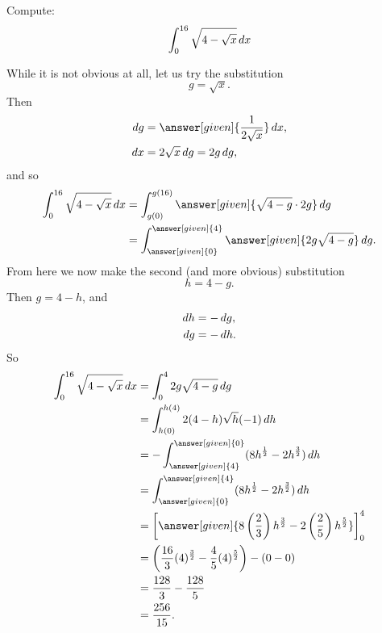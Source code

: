 \documentclass{ximera}
\begin{document}
\begin{example}
Compute:
\[
\int_0^{16} \sqrt{4 - \sqrt{x}} \mathop{}\!d x
\]
\begin{explanation}
While it is not obvious at all, let us try the substitution
\[
g = \sqrt{x}.
\]
Then
\begin{align*}
\d g &= \answer[given]{\frac{1}{2 \sqrt{x}}} \d x,\\
\d x &= 2 \sqrt{x} \d g = 2g \d g,
\end{align*}
and so
\begin{align*}
\int_0^{16} \sqrt{4 - \sqrt{x}} \d x &= \int_{g(0)}^{g(16)} \answer[given]{\sqrt{4-g} \cdot 2g} \d g  \\
&= \int_{\answer[given]{0}}^{\answer[given]{4}} \answer[given]{2g \sqrt{4-g}} \d g.
\end{align*}
From here we now make the second (and more obvious) substitution
\[
h = 4-g.
\]
Then $g = 4-h$, and
\begin{align*}
\mathop{}\!d h &= - \mathop{}\!d g,\\
\mathop{}\!d g &= - \mathop{}\!d h.
\end{align*}
So
\begin{align*}
\int_0^{16} \sqrt{4 - \sqrt{x}} \d x &= \int_0^4 2g \sqrt{4-g} \d g  \\
&= \int_{h(0)}^{h(4)} 2 (4-h) \sqrt{h} (-1) \d h  \\
&= - \int_{\answer[given]{4}}^{\answer[given]{0}} ( 8h^{\frac{1}{2}} - 2h^{\frac{3}{2}} ) \d h  \\
&= \int_{\answer[given]{0}}^{\answer[given]{4}} ( 8h^{\frac{1}{2}} - 2h^{\frac{3}{2}} ) \d h  \\
&= \eval{ \answer[given]{8 \left( \frac{2}{3} \right) h^{\frac{3}{2}} - 2 \left( \frac{2}{5} \right) h^{\frac{5}{2}}} }_{0}^{4}  \\
&= \left( \frac{16}{3} (4)^{\frac{3}{2}} - \frac{4}{5} (4)^{\frac{5}{2}} \right) - \left( 0 - 0 \right)  \\
&= \frac{128}{3} - \frac{128}{5}   \\
&= \frac{256}{15}.
\end{align*}
\end{explanation}
\end{example}
\end{document}
